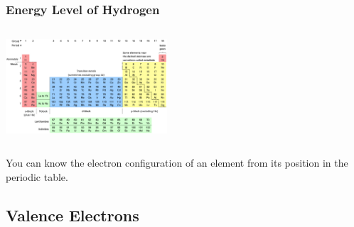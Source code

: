 \documentclass{beamer}
\begin{document}
\begin{frame}


        \frametitle{Energy Level of Hydrogen}
        \begin{columns}
            
            \begin{column}{0.5\textwidth}
                \includegraphics[width=6cm]{../../../../public/images/pTable.png}
                
            \end{column}
            \begin{column}{0.5\textwidth}
    
                
            \end{column}
        \end{columns}
    
        \vspace{1cm}

    \onslide You can know the 
    \pause \alert{electron} 
    \onslide configuration of an element from its 
    \pause \alert{position} 
    \onslide in the periodic table. 
\end{frame}




\subsection{Valence Electrons}
\end{document}

